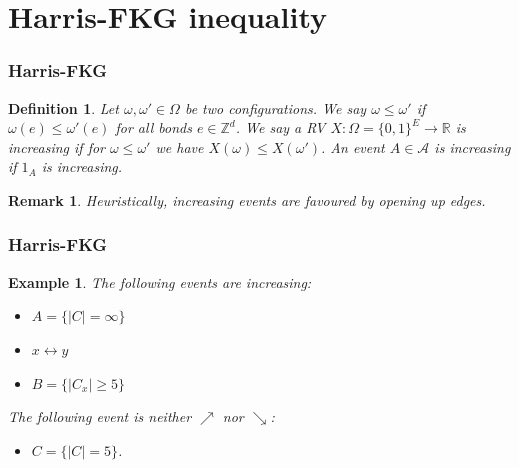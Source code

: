 \documentclass[compress,mathserif,serif]{beamer}
\newtheorem{dfn}{Definition}
\newtheorem{rem}{Remark}
\newtheorem{exm}{Example}
\begin{document}
\section{Harris-FKG inequality}

\begin{frame}
\begin{center}
\Huge{}
\end{center}
\end{frame}

\begin{frame}
\frametitle{Harris-FKG}
\begin{dfn} Let $\omega, \omega' \in \Omega$ be two configurations. We say $\omega \leq \omega'$ if $\omega(e) \leq \omega'(e)$ for all bonds $e \in \mathbb{Z}^d$. We say a RV $X: \Omega= \{0,1\}^E \to \mathbb{R}$ is increasing if for $\omega \leq \omega'$ we have $X( \omega) \leq X( \omega')$. An event $A \in \mathcal{A}$ is increasing if $1_A$ is increasing. 
\end{dfn}
\pause
\begin{rem} Heuristically, increasing events are favoured by opening up edges. 
\end{rem}
\end{frame}

\begin{frame}
\frametitle{Harris-FKG}
\begin{exm}The following events are increasing: 
\begin{itemize}
\item $A= \{|C|= \infty\}$ 
\pause
\item $x \longleftrightarrow y$
\pause
\item $B= \{|C_x| \geq 5\}$
\end{itemize}
\pause The following event is neither $\nearrow$ nor $\searrow$:
\begin{itemize}
\item $C= \{|C|=5 \}$.
\end{itemize}
\end{exm}
\end{frame}
\end{document}
